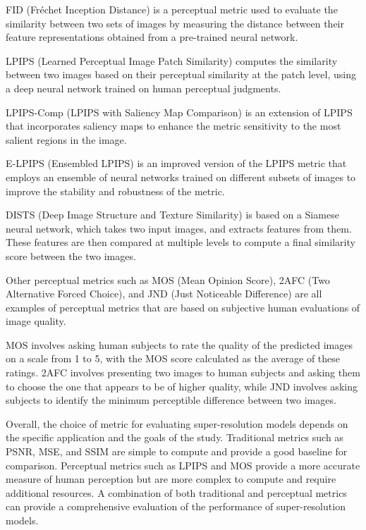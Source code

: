 FID (Fréchet Inception Distance) is a perceptual metric used to evaluate the similarity between two sets of images by measuring the distance between their feature representations obtained from a pre-trained neural network.

LPIPS (Learned Perceptual Image Patch Similarity) computes the similarity between two images based on their perceptual similarity at the patch level, using a deep neural network trained on human perceptual judgments.

LPIPS-Comp (LPIPS with Saliency Map Comparison) is an extension of LPIPS that incorporates saliency maps to enhance the metric sensitivity to the most salient regions in the image.

E-LPIPS (Ensembled LPIPS) is an improved version of the LPIPS metric that employs an ensemble of neural networks trained on different subsets of images to improve the stability and robustness of the metric.

DISTS (Deep Image Structure and Texture Similarity) is based on a Siamese neural network, which takes two input images, and extracts features from them. These features are then compared at multiple levels to compute a final similarity score between the two images.

Other perceptual metrics such as MOS (Mean Opinion Score), 2AFC (Two Alternative Forced Choice), and JND (Just Noticeable Difference) are all examples of perceptual metrics that are based on subjective human evaluations of image quality.

MOS involves asking human subjects to rate the quality of the predicted images on a scale from 1 to 5, with the MOS score calculated as the average of these ratings. 2AFC involves presenting two images to human subjects and asking them to choose the one that appears to be of higher quality, while JND involves asking subjects to identify the minimum perceptible difference between two images.

Overall, the choice of metric for evaluating super-resolution models depends on the specific application and the goals of the study. Traditional metrics such as PSNR, MSE, and SSIM are simple to compute and provide a good baseline for comparison. Perceptual metrics such as LPIPS and MOS provide a more accurate measure of human perception but are more complex to compute and require additional resources. A combination of both traditional and perceptual metrics can provide a comprehensive evaluation of the performance of super-resolution models.

